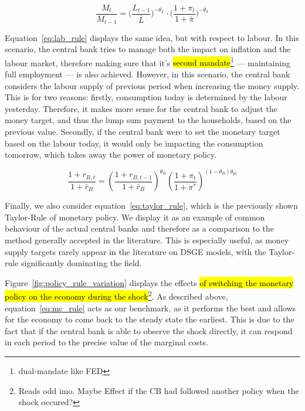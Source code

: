 \documentclass[12pt]{article}
\begin{document}
\begin{equation}\label{eq:lab_rule}
    \frac{M_t}{M_{t-1}}
        = \Big(\frac{L_{t-1}}{\bar{L}}\Big)^{-\theta_L}
          \cdot \Big(\frac{1 + \pi_t}{1 + \bar{\pi}}\Big)^{-\theta_{\pi}}
\end{equation}

Equation~\ref{eq:lab_rule} displays the same idea, but with respect to labour. In this scenario, the central bank tries to manage both the impact on inflation and the labour market, therefore making sure that it's \hl{second mandate}\footnote{dual-mandate like FED} --- maintaining full employment --- is also achieved. However, in this scenario, the central bank considers the labour supply of previous period when increasing the money supply. This is for two reasons: firstly, consumption today is determined by the labour yesterday. Therefore, it makes more sense for the central bank to adjust the money target, and thus the lump sum payment to the households, based on the previous value. Secondly, if the central bank were to set the monetary target based on the labour today, it would only be impacting the consumption tomorrow, which takes away the power of monetary policy.  

\begin{equation}\label{eq:taylor_rule}
    \frac{1 + r_{B,t}}{1 + \bar{r}_B} = \left( \frac{1 + r_{B,t-1}}{1 + \bar{r}_B} \right)^{\theta_R} \left( \frac{1 + \pi_t}{1 + \pi^*} \right)^{(1 - \theta_R)\theta_{pi}}
\end{equation}

Finally, we also consider equation~\ref{eq:taylor_rule}, which is the previously shown Taylor-Rule of monetary policy. We display it as an example of common behaviour of the actual central banks and therefore as a comparison to the method generally accepted in the literature. This is especially useful, as money supply targets rarely appear in the literature on DSGE models, with the Taylor-rule significantly dominating the field.  


Figure~\ref{fig:policy_rule_variation} displays the effects \hl{of switching the monetary policy on the economy during the shock}\footnote{Reads odd imo. Maybe Effect if the CB had followed another policy when the shock occured?}. As described above, equation~\ref{eq:mc_rule} acts as our benchmark, as it performs the best and allows for the economy to come back to the steady state the earliest. This is due to the fact that if the central bank is able to observe the shock directly, it can respond in each period to the precise value of the marginal costs.
\end{document}
